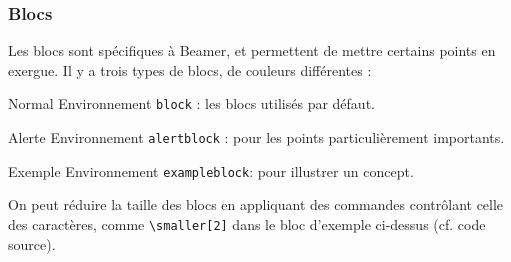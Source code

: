 \documentclass[10pt,    %
    french,             %
    xcolor=table,       %
    envcountsect,       %
    aspectratio=43      %
]{beamer}
\begin{document}
\begin{frame}
        
\end{frame}

\begin{frame}
    \frametitle{Blocs}
    \label{frm:blocks}
    
    Les blocs sont spécifiques à Beamer, et permettent de mettre certains points en exergue. Il y a trois types de blocs, de couleurs différentes :

    \begin{block}{Normal}
        Environnement \texttt{block} : les blocs utilisés par défaut.
    \end{block}

    \begin{alertblock}{Alerte}
        Environnement \texttt{alertblock} : pour les points particulièrement importants.
    \end{alertblock}

    \begin{exampleblock}{\smaller[2] Exemple}
        \smaller[2] Environnement \texttt{exampleblock}: pour illustrer un concept.
    \end{exampleblock}
    
    On peut réduire la taille des blocs en appliquant des commandes contrôlant celle des caractères, comme \texttt{\textbackslash{}smaller[2]} dans le bloc d'exemple ci-dessus (cf. code source).
    
        
        
    
    
\end{frame}
\end{document}
